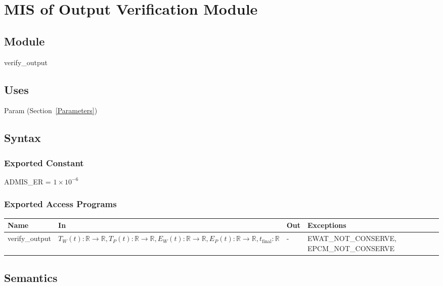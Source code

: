 \documentclass[12pt, titlepage]{article}
\begin{document}
\newpage
\section{MIS of Output Verification Module} \label{VerifyOutput}

\subsection{Module}

verify\_output

\subsection{Uses}

Param (Section~\ref{Parameters})

\subsection{Syntax}

\subsubsection{Exported Constant}

ADMIS\_ER = $1 \times 10^{-6}$

\subsubsection{Exported Access Programs}

\begin{center}
\begin{tabular}{p{3cm} p{7cm} p{1cm} p{2cm}}
\hline
\textbf{Name} & \textbf{In} & \textbf{Out} & \textbf{Exceptions} \\
\hline
verify\_output & $T_W(t):\mathbb{R} \rightarrow \mathbb{R},
                 T_P(t):\mathbb{R} \rightarrow \mathbb{R},
                 E_W(t):\mathbb{R} \rightarrow \mathbb{R},
                 E_P(t):\mathbb{R} \rightarrow \mathbb{R},
                 t_\text{final}: \mathbb{R}$ & - & EWAT\_NOT\_CONSERVE, EPCM\_NOT\_CONSERVE \\
\hline
\end{tabular}
\end{center}

\subsection{Semantics}
\end{document}
